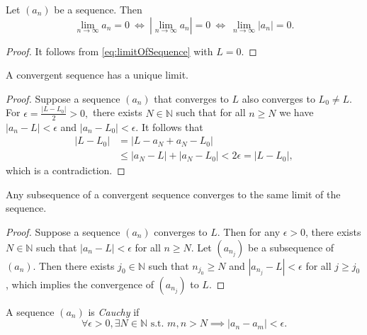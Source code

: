 \begin{lem}
  \label{lem:seqCvTo0IsEqulvalentToAbsoluteSeqCvTo0}
  Let $(a_{n})$ be a sequence. Then
  \begin{displaymath}
    \lim_{n\rightarrow \infty}a_{n}=0\
    \Leftrightarrow\
    \left|\lim_{n\rightarrow \infty}a_{n}\right|=0\
    \Leftrightarrow\
    \lim_{n\rightarrow\infty}|a_{n}|=0.
  \end{displaymath}
\end{lem}
\begin{proof}
  It follows from \eqref{eq:limitOfSequence} with $L=0$.
\end{proof}

\begin{lem}
  \label{lem:seqLimitIsUnique}
  A convergent sequence has a unique limit.
\end{lem}
\begin{proof}
  Suppose a sequence $(a_{n})$ that converges to $L$
  also converges to $L_{0}\neq L.$
  For $\epsilon=\frac{|L-L_{0}|}{2}>0,$ there exists $N\in \mathbb{N}$
  such that for all $n\ge N$ we have
  $|a_{n}-L|<\epsilon$ and $|a_{n}-L_{0}|<\epsilon$. It follows that
  \begin{align*}
    |L-L_{0}|&= |L-a_{N}+a_{N}-L_{0}|\\
    &\le |a_{N}-L|+|a_{N}-L_{0}|
    < 2\epsilon = |L-L_{0}|,
  \end{align*}
  which is a contradiction.
\end{proof}

\begin{lem}
  \label{lem:subsequenceInConvergentSequenceIsConvergent}
  Any subsequence of a convergent sequence converges
  to the same limit of the sequence.
\end{lem}
\begin{proof}
  Suppose a sequence $(a_{n})$ converges to $L$.
  Then for any $\epsilon>0$, there exists $N\in \mathbb{N}$ such that
  $|a_{n}-L|<\epsilon$ for all $n\ge N$.
  Let $(a_{n_{j}})$ be a subsequence of $(a_{n})$.
  Then there exists $j_{0}\in \mathbb{N}$
  such that $n_{j_{0}}\ge N$
  and $|a_{n_{j}}-L|<\epsilon$ for all $j\ge j_{0}$,
  which implies the convergence of $(a_{n_{j}})$ to $L$.
\end{proof}

\begin{defn}
  \label{def:CauchySequence}
  A sequence $(a_n)$ is \emph{Cauchy} if
  \begin{equation}
    \label{eq:CauchySequence}
    \forall \epsilon>0, \exists N\in \mathbb{N}
    \text{ s.t. } m,n>N \implies |a_n-a_m| < \epsilon.
  \end{equation}
\end{defn}

